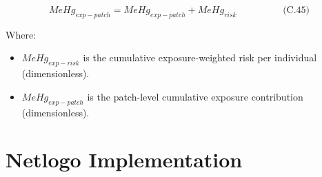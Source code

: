 \documentclass[
]{book}
\providecommand{\tightlist}{%
  \setlength{\itemsep}{0pt}\setlength{\parskip}{0pt}}
\begin{document}
\[
\begin{equation} MeHg_{exp-patch} = MeHg_{exp-patch} + MeHg_{risk} \hspace{2cm} \text{(C.45)} \end{equation}
\]

Where:

\begin{itemize}
\tightlist
\item
  \(MeHg_{exp-risk}\) is the cumulative exposure-weighted risk per
  individual (dimensionless).
\item
  \(MeHg_{exp-patch}\) is the patch-level cumulative exposure
  contribution (dimensionless).
\end{itemize}

\section{Netlogo Implementation}\label{netlogo-implementation-4}
\end{document}
